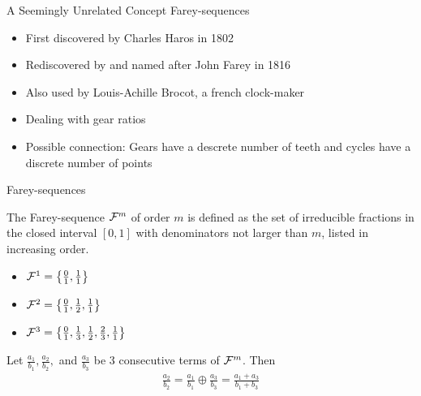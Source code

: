 \begin{frame}{A Seemingly Unrelated Concept}
	Farey-sequences
	\begin{itemize}
		\item First discovered by Charles Haros in 1802
		\item Rediscovered by and named after John Farey in 1816 \pause
		\item Also used by Louis-Achille Brocot, a french clock-maker
		\item Dealing with gear ratios \pause
		\item Possible connection: Gears have a descrete number of teeth and cycles have a discrete number of points
	\end{itemize}
\end{frame}

\begin{frame}{Farey-sequences}
	\vspace{-1em}
	\begin{definition}
		The Farey-sequence $\mathcal{F}^m$ of order $m$ is defined as the set of irreducible fractions in the closed interval $[0, 1]$
		with denominators not larger than $m$, listed in increasing order.
	\end{definition}
	\pause
	\begin{itemize}
		\item $\mathcal{F}^1 = \left\{ \frac{0}{1}, \frac{1}{1} \right\}$ \vspace{.1em}
		\item $\mathcal{F}^2 = \left\{ \frac{0}{1}, \frac{1}{2}, \frac{1}{1} \right\}$ \vspace{.1em}
		\item $\mathcal{F}^3 = \left\{ \frac{0}{1}, \frac{1}{3}, \frac{1}{2}, \frac{2}{3}, \frac{1}{1} \right\}$
	\end{itemize}
	\pause
	\begin{theorem}
		Let $\frac{a_1}{b_1}, \frac{a_2}{b_2},$ and $\frac{a_3}{b_3}$ be 3 consecutive terms of $\mathcal{F}^m$. Then
		\begin{align*}
			\frac{a_2}{b_2} = \frac{a_1}{b_1} \oplus \frac{a_3}{b_3} = \frac{a_1 + a_3}{b_1 + b_3}
		\end{align*}
	\end{theorem}
\end{frame}

